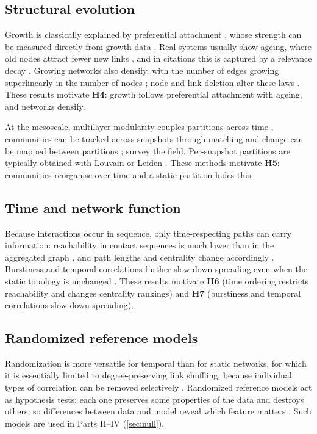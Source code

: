 \subsection{Structural evolution}
\label{sec:rw-evolution}
Growth is classically explained by preferential attachment
\citep{barabasi1999emergence}, whose strength can be measured directly from
growth data \citep{jeong2003measuring,newman2001clustering}. Real systems usually
show ageing, where old nodes attract fewer new links
\citep{dorogovtsev2000aging}, and in citations this is captured by a relevance
decay \citep{wang2013quantifying}. Growing networks also densify, with the number of
edges growing superlinearly in the number of nodes
\citep{leskovec2005graphs,leskovec2007graph}; node and link deletion alter these
laws \citep{moore2006exact}. These results motivate \textbf{H4}: growth follows preferential
attachment with ageing, and networks densify.

At the mesoscale, multilayer modularity couples partitions across time
\citep{mucha2010community}, communities can be tracked across snapshots through
matching \citep{greene2010tracking} and change can be mapped between partitions
\citep{rosvall2010mapping}; \citet{rossetti2018community} survey the field. Per-snapshot
partitions are typically obtained with Louvain \citep{blondel2008fast} or Leiden
\citep{traag2019louvain}. These methods motivate \textbf{H5}: communities reorganise over time and
a static partition hides this.

\subsection{Time and network function}
\label{sec:rw-function}
Because interactions occur in sequence, only time-respecting paths can carry
information: reachability in contact sequences is much lower than in the aggregated
graph \citep{holme2005network}, and path lengths and centrality change accordingly
\citep{pan2011path,kim2012temporal}. Burstiness and temporal correlations further
slow down spreading even when the static topology is unchanged
\citep{karsai2011small}. These results motivate \textbf{H6} (time ordering restricts
reachability and changes centrality rankings) and \textbf{H7} (burstiness and
temporal correlations slow down spreading).

\subsection{Randomized reference models}
\label{sec:rw-null}
Randomization is more versatile for temporal than for static networks, for which it is
essentially limited to degree-preserving link shuffling, because individual types of
correlation can be removed selectively \citep{holme2015modern}. Randomized reference models act as hypothesis tests: each one preserves some
properties of the data and destroys others, so differences between data and model
reveal which feature matters \citep{gauvin2022randomized}. Such models are used in
Parts II--IV (\cref{sec:null}).

